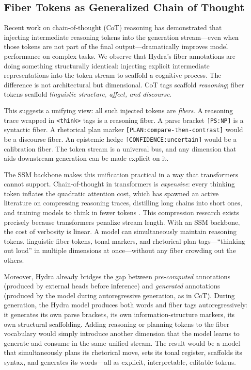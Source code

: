 \documentclass[11pt]{article}
\begin{document}
\subsection{Fiber Tokens as Generalized Chain of Thought}

Recent work on chain-of-thought (CoT) reasoning 
\citep{wei2022chain,nye2021show} has demonstrated that injecting 
intermediate reasoning tokens into the generation stream---even when 
those tokens are not part of the final output---dramatically improves 
model performance on complex tasks. We observe that Hydra's fiber 
annotations are doing something structurally identical: injecting 
explicit intermediate representations into the token stream to scaffold 
a cognitive process. The difference is not architectural but dimensional. 
CoT tags scaffold \emph{reasoning}; fiber tokens scaffold 
\emph{linguistic structure, affect, and discourse}.

This suggests a unifying view: all such injected tokens are 
\emph{fibers}. A reasoning trace wrapped in \texttt{<think>} tags is 
a reasoning fiber. A parse bracket \texttt{[PS:NP]} is a syntactic 
fiber. A rhetorical plan marker \texttt{[PLAN:compare-then-contrast]} 
would be a discourse fiber. An epistemic hedge 
\texttt{[CONFIDENCE:uncertain]} would be a calibration fiber. The token 
stream is a universal bus, and any dimension that aids downstream 
generation can be made explicit on it.

The SSM backbone makes this unification practical in a way that 
transformers cannot support. Chain-of-thought in transformers is 
\emph{expensive}: every thinking token inflates the quadratic attention 
cost, which has spawned an active literature on compressing reasoning 
traces, distilling long chains into short ones, and training models to 
think in fewer tokens \citep{deng2024explicit,goyal2024think}. This 
compression research exists precisely because transformers penalize 
stream length. With an SSM backbone, the cost of verbosity is linear. 
A model can simultaneously maintain reasoning tokens, linguistic fiber 
tokens, tonal markers, and rhetorical plan tags---``thinking out loud'' 
in multiple dimensions at once---without any fiber crowding out the 
others.

Moreover, Hydra already bridges the gap between \emph{pre-computed} 
annotations (produced by external heads before inference) and 
\emph{generated} annotations (produced by the model during 
autoregressive generation, as in CoT). During generation, the Hydra 
model produces both words and fiber tags autoregressively: it generates 
its own parse brackets, its own information-structure markers, its own 
structural scaffolding. Adding reasoning or planning tokens to the fiber 
vocabulary would simply introduce another dimension that the model 
learns to generate and consume in the same unified stream. The result 
would be a model that simultaneously plans its rhetorical move, sets 
its tonal register, scaffolds its syntax, and generates its words---all 
as explicit, interpretable, editable tokens.
\end{document}

